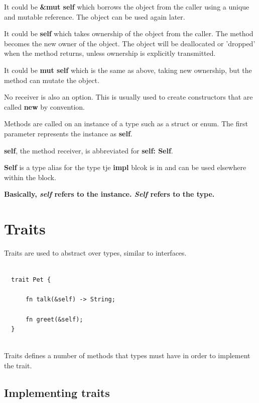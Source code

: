 \documentclass[11pt]{article}
\begin{document}
It could be \textbf{\&mut self} which borrows the object from the caller using a unique and mutable reference. The object can be used again later.

It could be \textbf{self} which takes ownership of the object from the caller. The method becomes the new owner of the object. The object will be deallocated or 'dropped' when the method returns, unless ownership is explicitly transmitted.

It could be \textbf{mut self} which is the same as above, taking new ownership, but the method can mutate the object.

No receiver is also an option. This is usually used to create constructors that are called \textbf{new} by convention.

Methods are called on an instance of a type such as a struct or enum. The first parameter represents the instance as \textbf{self}.

\textbf{self}, the method receiver, is abbreviated for \textbf{self: Self}.

\textbf{Self} is a type alias for the type tje \textbf{impl} blcok is in and can be used elsewhere within the block.

\textbf{Basically, \emph{self} refers to the instance. \emph{Self} refers to the type.}
\section{Traits}
\label{sec:org4f21e3d}

Traits are used to abstract over types, similar to interfaces.

\begin{verbatim}

  trait Pet {

      fn talk(&self) -> String;

      fn greet(&self);
  }


\end{verbatim}

Traits defines a number of methods that types must have in order to implement the trait.
\subsection{Implementing traits}
\label{sec:orgbcd6c0f}
\end{document}
